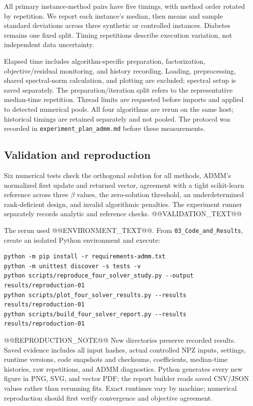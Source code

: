 \documentclass[10pt,letterpaper]{article}
\begin{document}
All primary instance-method pairs have five timings, with method order rotated by repetition. We report each instance's median, then means and sample standard deviations across three synthetic or controlled instances. Diabetes remains one fixed split. Timing repetitions describe execution variation, not independent data uncertainty.

Elapsed time includes algorithm-specific preparation, factorization, objective/residual monitoring, and history recording. Loading, preprocessing, shared spectral-norm calculation, and plotting are excluded; spectral setup is saved separately. The preparation/iteration split refers to the representative median-time repetition. Thread limits are requested before imports and applied to detected numerical pools. All four algorithms are rerun on the same host; historical timings are retained separately and not pooled. The protocol was recorded in \texttt{experiment\_plan\_admm.md} before these measurements.

\subsection{Validation and reproduction}\label{sec:reproducibility}
Six numerical tests check the orthogonal solution for all methods, ADMM's normalized first update and returned vector, agreement with a tight scikit-learn reference across three $\beta$ values, the zero-solution threshold, an underdetermined rank-deficient design, and invalid algorithmic penalties. The experiment runner separately records analytic and reference checks. @@VALIDATION_TEXT@@

The rerun used @@ENVIRONMENT_TEXT@@. From \texttt{03\_Code\_and\_Results}, create an isolated Python environment and execute:
{\small
\begin{verbatim}
python -m pip install -r requirements-admm.txt
python -m unittest discover -s tests -v
python scripts/reproduce_four_solver_study.py --output results/reproduction-01
python scripts/plot_four_solver_results.py --results results/reproduction-01
python scripts/build_four_solver_report.py --results results/reproduction-01
\end{verbatim}
}
@@REPRODUCTION_NOTE@@
New directories preserve recorded results. Saved evidence includes all input hashes, actual controlled NPZ inputs, settings, runtime versions, code snapshots and checksums, coefficients, median-time histories, raw repetitions, and ADMM diagnostics. Python generates every new figure in PNG, SVG, and vector PDF; the report builder reads saved CSV/JSON values rather than rerunning fits. Exact runtimes vary by machine; numerical reproduction should first verify convergence and objective agreement.
\end{document}

